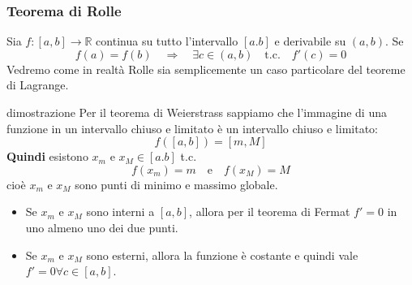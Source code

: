 \documentclass[x11names]{article}
\begin{document}
	
	\begin{center}
		\colorbox{myred}{\begin{minipage}{5.75in}
				\begin{redes}{}
					\subsubsection{Teorema di Rolle}
					Sia $f: [a,b] \to \mathbb{R}$ continua su tutto l'intervallo $[a.b]$ e derivabile su $(a,b)$. 
					Se
					\[
					f(a) = f(b) \quad \Longrightarrow \quad \exists c \in (a,b) \quad \text{t.c.} \quad f'(c) = 0
					\]
					Vedremo come in realtà Rolle sia semplicemente un caso particolare del teoreme di Lagrange.
				\end{redes}
		\end{minipage}}        
	\end{center}
	\begin{es}{dimostrazione}
		Per il teorema di Weierstrass sappiamo che l'immagine di una funzione in un intervallo chiuso e limitato è un intervallo chiuso e limitato:
		\[
		f([a,b]) =  [m,M]
		\]
		\textbf{Quindi} esistono $x_m$ e $x_M \in [a.b]$ t.c. 
		\[
		f(x_m) = m \quad \text{e} \quad f(x_M) = M
		\]
		cioè $x_m$ e $x_M$ sono punti di minimo e massimo globale. 
		\begin{itemize}
			\item Se $x_m$ e $x_M$ sono interni a $[a,b]$, allora per il teorema di Fermat $f'=0$ in uno almeno uno dei due punti.
			\item Se $x_m$ e $x_M$ sono esterni, allora la funzione è costante e quindi vale $f'=0 \forall c \in [a,b]$.
		\end{itemize}
	\end{es}
	
\end{document}

